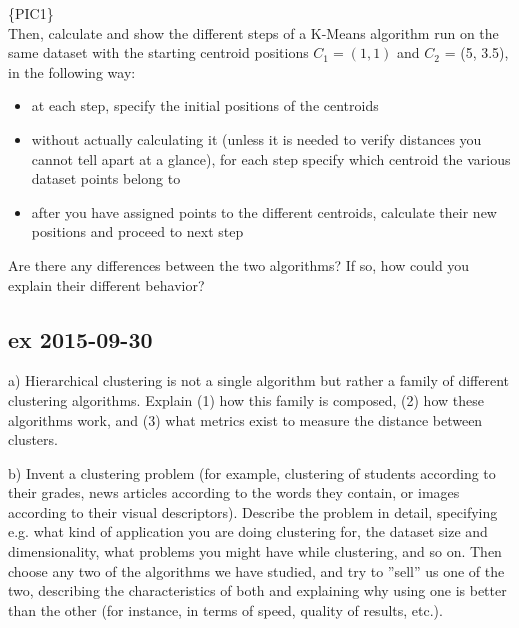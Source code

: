 \documentclass[a4paper,12pt,titlepage]{article} %
\begin{document}
\{PIC1\}\\

Then, calculate and show the different steps of a K-Means algorithm run on the same dataset with the starting centroid positions $ C_{1} = (1, 1)$ and $ C_{2} $ = (5, 3.5), in the following way:
\begin{itemize}
\item at each step, specify the initial positions of the centroids
\item without actually calculating it (unless it is needed to verify distances you cannot tell apart at a glance), for each step specify which centroid the various dataset points belong to
\item after you have assigned points to the different centroids, calculate their new positions and proceed to next step
\end{itemize}
Are there any differences between the two algorithms? If so, how could you explain their different behavior?

\subsection{ex 2015-09-30}
a) Hierarchical clustering is not a single algorithm but rather a family of different clustering algorithms. Explain (1) how this family is composed, (2) how these algorithms work, and (3) what metrics exist to measure the distance between clusters.

b) Invent a clustering problem (for example, clustering of students according to their grades, news articles according to the words they contain, or images according to their visual descriptors). Describe the problem in detail, specifying e.g. what kind of application you are doing clustering for, the dataset size and dimensionality, what problems you might have while clustering, and so on. Then choose any two of the algorithms we have studied, and try to ”sell” us one of the two, describing the characteristics of both and explaining why using one is better than the other (for instance, in terms of speed, quality of results, etc.).
\end{document}
